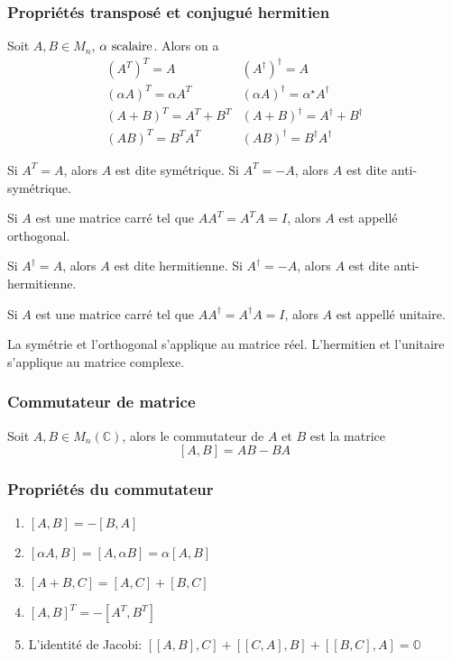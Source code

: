 \subsubsection{Propriétés transposé et conjugué hermitien}
\noindent
Soit $A, B \in M_n$, $\alpha \text{ scalaire}$. Alors on a
\[
    \begin{matrix}
        \left( A^T \right)^T = A               & \left( A^\dagger \right)^\dagger = A                     \\[0.5em]
        \left( \alpha A \right)^T = \alpha A^T & \left( \alpha A \right)^\dagger = \alpha^\star A^\dagger \\[0.5em]
        \left( A + B \right)^T = A^T + B^T     & \left( A + B \right)^\dagger = A^\dagger + B^\dagger     \\[0.5em]
        \left( AB \right)^T = B^TA^T           & \left( AB \right)^\dagger = B^\dagger A^\dagger
    \end{matrix}
\]
\begin{definition}
    Si $A^T = A$, alors $A$ est dite symétrique. Si $A^T = -A$, alors $A$ est dite anti-symétrique.
\end{definition}
\begin{definition}
    Si $A$ est une matrice carré tel que $AA^T = A^TA = I$, alors $A$ est appellé orthogonal.
\end{definition}
\begin{definition}
    Si $A^\dagger = A$, alors $A$ est dite hermitienne. Si $A^\dagger = -A$, alors $A$ est dite anti-hermitienne.
\end{definition}
\begin{definition}
    Si $A$ est une matrice carré tel que $AA^\dagger = A^\dagger A = I$, alors $A$ est appellé unitaire.
\end{definition}
\begin{remark}
    La symétrie et l'orthogonal s'applique au matrice réel.
    L'hermitien et l'unitaire s'applique au matrice complexe.
\end{remark}

\subsubsection{Commutateur de matrice}
\noindent
Soit $A, B \in M_n(\mathbb{C})$, alors le commutateur de $A$ et $B$ est la matrice
\[ \left[ A, B \right] = AB - BA \]

\subsubsection{Propriétés du commutateur}
\begin{enumerate}
    \item $[A, B] = -[B, A]$
    \item $[\alpha A, B ] = [A, \alpha B] = \alpha [A, B]$
    \item $[A + B, C] = [A, C] + [B, C]$
    \item $[A, B]^T = -[A^T, B^T]$
    \item L'identité de Jacobi: $[[A, B], C] + [[C, A], B] + [[B, C], A] = \mathbb{O}$
\end{enumerate}

